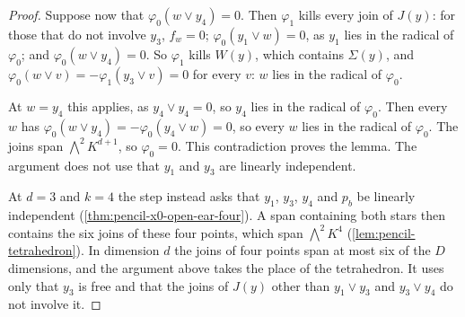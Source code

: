 \begin{proof}
  Suppose now that $\varphi_0(w \vee y_4) = 0$. Then $\varphi_1$ kills
  every join of $J(y)$: for those that do not involve $y_3$, $f_w = 0$;
  $\varphi_0(y_1 \vee w) = 0$, as $y_1$ lies in the radical of
  $\varphi_0$; and $\varphi_0(w \vee y_4) = 0$. So $\varphi_1$ kills
  $W(y)$, which contains $\Sigma(y)$, and
  $\varphi_0(w \vee v) = -\varphi_1(y_3 \vee v) = 0$ for every $v$: $w$
  lies in the radical of $\varphi_0$.

  At $w = y_4$ this applies, as $y_4 \vee y_4 = 0$, so $y_4$ lies in the
  radical of $\varphi_0$. Then every $w$ has
  $\varphi_0(w \vee y_4) = -\varphi_0(y_4 \vee w) = 0$, so every $w$ lies
  in the radical of $\varphi_0$. The joins span $\bigwedge^2 K^{d+1}$, so
  $\varphi_0 = 0$. This contradiction proves the lemma. The argument does
  not use that $y_1$ and $y_3$ are linearly independent.

  At $d = 3$ and $k = 4$ the step instead asks that $y_1$, $y_3$, $y_4$
  and $p_b$ be linearly independent (\cref{thm:pencil-x0-open-ear-four}).
  A span containing both stars then contains the six joins of these four
  points, which span $\bigwedge^2 K^4$ (\cref{lem:pencil-tetrahedron}).
  In dimension $d$ the joins of four points span at most six of the $D$
  dimensions, and the argument above takes the place of the tetrahedron.
  It uses only that $y_3$ is free and that the joins of $J(y)$ other than
  $y_1 \vee y_3$ and $y_3 \vee y_4$ do not involve it.
\end{proof}

